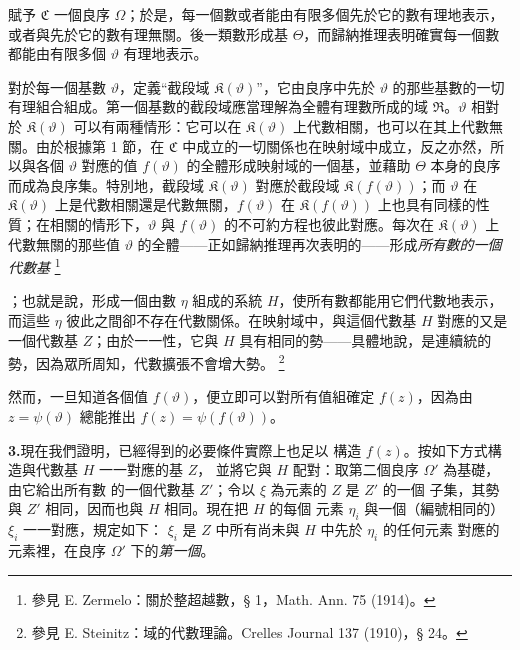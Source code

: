 \documentclass[11pt]{article}
\providecommand{\qtext}[1]{“#1”}
\providecommand{\Cfield}{\mathfrak C}
\providecommand{\Kfield}{\mathfrak K}
\providecommand{\Rfield}{\mathfrak R}
\providecommand{\srcfn}[2]{%
  \begingroup\renewcommand{\thefootnote}{#1}\footnote{#2}\addtocounter{footnote}{-1}\endgroup}
\begin{document}
賦予 \(\Cfield\) 一個良序 \(\Omega\)；於是，每一個數或者能由有限多個先於它的數有理地表示，或者與先於它的數有理無關。後一類數形成基 \(\Theta\)，而歸納推理表明確實每一個數都能由有限多個 \(\vartheta\) 有理地表示。

對於每一個基數 \(\vartheta\)，定義\qtext{截段域 \(\Kfield(\vartheta)\)}，它由良序中先於 \(\vartheta\) 的那些基數的一切有理組合組成。第一個基數的截段域應當理解為全體有理數所成的域 \(\Rfield\)。\(\vartheta\) 相對於 \(\Kfield(\vartheta)\) 可以有兩種情形：它可以在 \(\Kfield(\vartheta)\) 上代數相關，也可以在其上代數無關。由於根據第 1 節，在 \(\Cfield\) 中成立的一切關係也在映射域中成立，反之亦然，所以與各個 \(\vartheta\) 對應的值 \(f(\vartheta)\) 的全體形成映射域的一個基，並藉助 \(\Theta\) 本身的良序而成為良序集。特別地，截段域 \(\Kfield(\vartheta)\) 對應於截段域 \(\Kfield(f(\vartheta))\)；而 \(\vartheta\) 在 \(\Kfield(\vartheta)\) 上是代數相關還是代數無關，\(f(\vartheta)\) 在 \(\Kfield(f(\vartheta))\) 上也具有同樣的性質；在相關的情形下，\(\vartheta\) 與 \(f(\vartheta)\) 的不可約方程也彼此對應。每次在 \(\Kfield(\vartheta)\) 上代數無關的那些值 \(\vartheta\) 的全體——正如歸納推理再次表明的——形成\emph{所有數的一個代數基}\srcfn{*)}{參見 E. Zermelo：關於整超越數，§ 1，Math. Ann. 75 (1914)。}；也就是說，形成一個由數 \(\eta\) 組成的系統 \(H\)，使所有數都能用它們代數地表示，而這些 \(\eta\) 彼此之間卻不存在代數關係。在映射域中，與這個代數基 \(H\) 對應的又是一個代數基 \(Z\)；由於一一性，它與 \(H\) 具有相同的勢——具體地說，是連續統的勢，因為眾所周知，代數擴張不會增大勢。\srcfn{**)}{參見 E. Steinitz：域的代數理論。Crelles Journal 137 (1910)，§ 24。}然而，一旦知道各個值 \(f(\vartheta)\)，便立即可以對所有值組確定 \(f(z)\)，因為由 \(z=\psi(\vartheta)\) 總能推出 \(f(z)=\psi(f(\vartheta))\)。

\medskip
\noindent\textbf{3.}\quad 現在我們證明，已經得到的必要條件實際上也足以
構造 \(f(z)\)。按如下方式構造與代數基 \(H\) 一一對應的基 \(Z\)，
並將它與 \(H\) 配對：取第二個良序 \(\Omega'\) 為基礎，由它給出所有數
的一個代數基 \(Z'\)；令以 \(\xi\) 為元素的 \(Z\) 是 \(Z'\) 的一個
子集，其勢與 \(Z'\) 相同，因而也與 \(H\) 相同。現在把 \(H\) 的每個
元素 \(\eta_i\) 與一個（編號相同的）\(\xi_i\) 一一對應，規定如下：
\(\xi_i\) 是 \(Z\) 中所有尚未與 \(H\) 中先於 \(\eta_i\) 的任何元素
對應的元素裡，在良序 \(\Omega'\) 下的\emph{第一個}。
\end{document}
